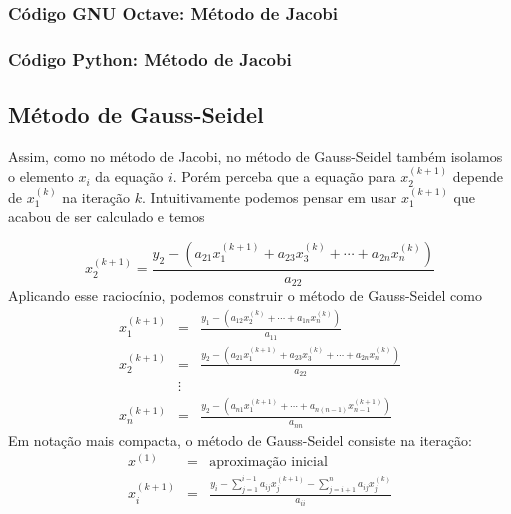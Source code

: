 
\fi
\ifisoctave
\subsubsection{Código GNU Octave: Método de Jacobi}


\fi
\ifispython
\subsubsection{Código Python: Método de Jacobi}


\fi

\subsection{Método de Gauss-Seidel}

Assim, como no método de Jacobi, no método de Gauss-Seidel também isolamos o elemento $x_i$ da equação $i$. Porém perceba que a equação para $x_2^{(k+1)}$ depende de $x_1^{(k)}$ na iteração $k$. Intuitivamente podemos pensar em usar $x_1^{(k+1)}$ que acabou de ser calculado e temos

\begin{equation}
x_2^{(k+1)} =\frac{y_2 - \left(a_{21}x_1^{(k+1)}+a_{23}x_3^{(k)}+\cdots+a_{2n}x_n^{(k)}\right)}{a_{22}}
\end{equation}
Aplicando esse raciocínio, podemos construir o método de Gauss-Seidel como
\begin{eqnarray}
x_1^{(k+1)}&=&\frac{y_1 - \left(a_{12}x_2^{(k)}+\cdots+a_{1n}x_n^{(k)}\right)}{a_{11}}\\
x_2^{(k+1)}&=&\frac{y_2 - \left(a_{21}x_1^{(k+1)}+a_{23}x_3^{(k)}+\cdots+a_{2n}x_n^{(k)}\right)}{a_{22}}\\
&\vdots&\\
x_n^{(k+1)}&=&\frac{y_2 - \left(a_{n1}x_1^{(k+1)}+\cdots+a_{n(n-1)}x_{n-1}^{(k+1)}\right)}{a_{nn}}
\end{eqnarray}
Em notação mais compacta, o método de Gauss-Seidel consiste na iteração:
\begin{eqnarray}
  x^{(1)} &=& \text{aproximação inicial}\\
  x_i^{(k+1)} &=& \frac{y_i - \sum_{j=1}^{i-1} a_{ij}x_j^{(k+1)} -\sum_{j=i+1}^{n} a_{ij}x_j^{(k)}}{a_{ii}}
\end{eqnarray}

